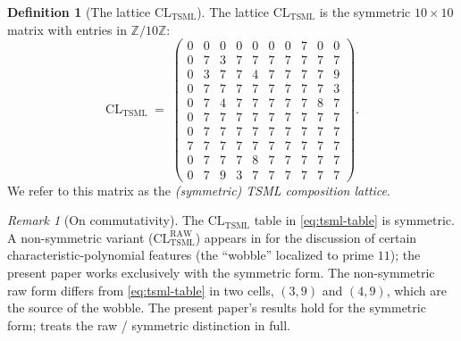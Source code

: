 \documentclass[11pt,reqno]{amsart}
\theoremstyle{plain}
\theoremstyle{definition}
\newtheorem{definition}[theorem]{Definition}
\theoremstyle{remark}
\newtheorem*{remark}{Remark}
\newcommand{\Z}{\mathbb{Z}}
\newcommand{\TSML}{\mathrm{TSML}}
\newcommand{\CL}{\mathrm{CL}}
\begin{document}
\begin{definition}[The lattice $\CL_{\TSML}$]
\label{def:tsml}
The lattice $\CL_{\TSML}$ is the symmetric $10 \times 10$ matrix
with entries in $\Z/10\Z$:
\begin{equation}
\label{eq:tsml-table}
\CL_{\TSML} \;=\;
\begin{pmatrix}
0 & 0 & 0 & 0 & 0 & 0 & 0 & 7 & 0 & 0 \\
0 & 7 & 3 & 7 & 7 & 7 & 7 & 7 & 7 & 7 \\
0 & 3 & 7 & 7 & 4 & 7 & 7 & 7 & 7 & 9 \\
0 & 7 & 7 & 7 & 7 & 7 & 7 & 7 & 7 & 3 \\
0 & 7 & 4 & 7 & 7 & 7 & 7 & 7 & 8 & 7 \\
0 & 7 & 7 & 7 & 7 & 7 & 7 & 7 & 7 & 7 \\
0 & 7 & 7 & 7 & 7 & 7 & 7 & 7 & 7 & 7 \\
7 & 7 & 7 & 7 & 7 & 7 & 7 & 7 & 7 & 7 \\
0 & 7 & 7 & 7 & 8 & 7 & 7 & 7 & 7 & 7 \\
0 & 7 & 9 & 3 & 7 & 7 & 7 & 7 & 7 & 7
\end{pmatrix}.
\end{equation}
We refer to this matrix as the \emph{(symmetric) TSML composition
lattice}.
\end{definition}

\begin{remark}[On commutativity]
The $\CL_{\TSML}$ table in \eqref{eq:tsml-table} is symmetric. A
non-symmetric variant ($\CL_{\TSML}^{\text{RAW}}$) appears in
\cite{SandersGishFourCore} for the discussion of certain
characteristic-polynomial features (the ``wobble'' localized to prime
$11$); the present paper works exclusively with the symmetric form.
The non-symmetric raw form differs from \eqref{eq:tsml-table} in two
cells, $(3, 9)$ and $(4, 9)$, which are the source of the wobble. The
present paper's results hold for the symmetric form;
\cite{SandersGishFourCore} treats the raw / symmetric distinction in
full.
\end{remark}
\end{document}
